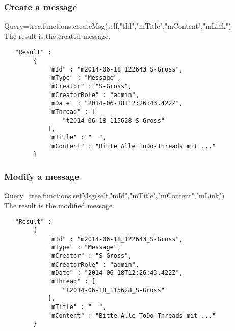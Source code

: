\documentclass[12pt,a4paper,oneside]{report}
\begin{document}
\subsubsection{Create a message}
Query=tree.functions.createMsg(self,"tId","mTitle","mContent","mLink")\\
The result is the created message.
\begin{lstlisting}
   "Result" :   
        { 
            "mId" : "m2014-06-18_122643_S-Gross",
            "mType" : "Message",
            "mCreator" : "S-Gross",
            "mCreatorRole" : "admin",
            "mDate" : "2014-06-18T12:26:43.422Z",
            "mThread" : [  
                "t2014-06-18_115628_S-Gross"
            ],
            "mTitle" : "  ",
            "mContent" : "Bitte Alle ToDo-Threads mit ..."
        }
\end{lstlisting}

\subsubsection{Modify a message}
Query=tree.functions.setMsg(self,"mId","mTitle","mContent","mLink")\\
The result is the modified message.
\begin{lstlisting}
   "Result" :   
        { 
            "mId" : "m2014-06-18_122643_S-Gross",
            "mType" : "Message",
            "mCreator" : "S-Gross",
            "mCreatorRole" : "admin",
            "mDate" : "2014-06-18T12:26:43.422Z",
            "mThread" : [  
                "t2014-06-18_115628_S-Gross"
            ],
            "mTitle" : "  ",
            "mContent" : "Bitte Alle ToDo-Threads mit ..."
        }
\end{lstlisting}
\end{document}
